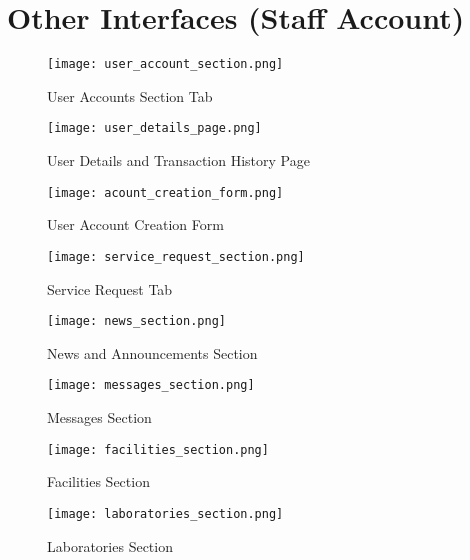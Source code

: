 %
%
%                 

\chapter{Other Interfaces (Staff Account)}
\label{sec:appendixa}



%

\begin{figure}[h]
	\centering 
	\texttt{[image: user\_account\_section.png]}
	\caption{User Accounts Section Tab}
	\label{fig:user_accounts_section}
\end{figure}

\begin{figure}[h]
	\centering 
	\texttt{[image: user\_details\_page.png]}
	\caption{User Details and Transaction History Page}
	\label{fig:user_details_page}
\end{figure}

\begin{figure}[h]
	\centering 
	\texttt{[image: acount\_creation\_form.png]}
	\caption{User Account Creation Form}
	\label{fig:acount_creation_form}
\end{figure}

\begin{figure}[h]
	\centering 
	\texttt{[image: service\_request\_section.png]}
	\caption{Service Request Tab}
	\label{fig:service request section}
\end{figure}

\begin{figure}[h]
	\centering 
	\texttt{[image: news\_section.png]}
	\caption{News and Announcements Section}
	\label{fig:news section}
\end{figure}

\begin{figure}[h]
	\centering 
	\texttt{[image: messages\_section.png]}
	\caption{Messages Section}
	\label{fig:messages section}
\end{figure}

\begin{figure}[h]
	\centering 
	\texttt{[image: facilities\_section.png]}
	\caption{Facilities Section}
	\label{fig:facilities section}
\end{figure}

\begin{figure}[h]
	\centering 
	\texttt{[image: laboratories\_section.png]}
	\caption{Laboratories Section}
	\label{fig:laboratories section}
\end{figure}
